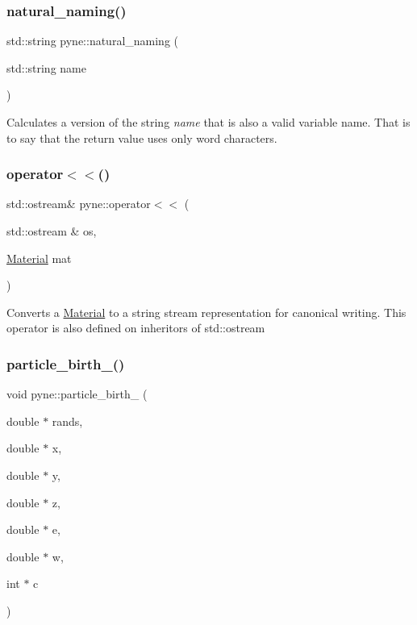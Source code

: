 \subsubsection{\texorpdfstring{natural\+\_\+naming()}{natural\_naming()}}
{\footnotesize\ttfamily std\+::string pyne\+::natural\+\_\+naming (\begin{DoxyParamCaption}\item[{std\+::string}]{name }\end{DoxyParamCaption})}

Calculates a version of the string {\itshape name} that is also a valid variable name. That is to say that the return value uses only word characters. \mbox{\label{namespacepyne_a1241699bbd3224bb066190b7778dbd82}} 
\subsubsection{\texorpdfstring{operator$<$$<$()}{operator<<()}}
{\footnotesize\ttfamily std\+::ostream\& pyne\+::operator$<$$<$ (\begin{DoxyParamCaption}\item[{std\+::ostream \&}]{os,  }\item[{\hyperlink{classpyne_1_1_material}{Material}}]{mat }\end{DoxyParamCaption})}

Converts a \hyperlink{classpyne_1_1_material}{Material} to a string stream representation for canonical writing. This operator is also defined on inheritors of std\+::ostream \mbox{\label{namespacepyne_a901431eea411922dfec3f8cbc157c8af}} 
\subsubsection{\texorpdfstring{particle\+\_\+birth\+\_\+()}{particle\_birth\_()}}
{\footnotesize\ttfamily void pyne\+::particle\+\_\+birth\+\_\+ (\begin{DoxyParamCaption}\item[{double $\ast$}]{rands,  }\item[{double $\ast$}]{x,  }\item[{double $\ast$}]{y,  }\item[{double $\ast$}]{z,  }\item[{double $\ast$}]{e,  }\item[{double $\ast$}]{w,  }\item[{int $\ast$}]{c }\end{DoxyParamCaption})}

